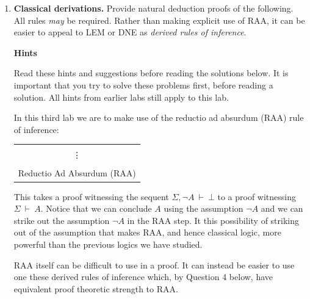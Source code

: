\documentclass[11pt]{report}
\newcommand{\temp}[2]{{\overline{#2}}^{#1}}
\begin{document}
\begin{enumerate}
\begin{enumerate}
			\begin{center}
				$\begin{array}{c}
					\infer[\lor E]{A}
						{\temp{\text{LEM}}{A \lor \lnot A}
						&
						A \to A
						&
						\infer[\to I,1]{\lnot A \to A}
							{\infer[\XF]{A}
								{\infer[\MP]{\bot}
									{\infer[1]{\cancel{\lnot A}}{}
									&
									\lnot \lnot A}}}}
				\end{array}$
			\end{center}
	\end{enumerate}
	
	\newpage
	\item \textbf{Classical derivations.} Provide natural deduction proofs of the following. All rules \emph{may} be required. Rather than making explicit use of RAA, it can be easier to appeal to LEM or DNE as \emph{derived rules of inference}. 
	
	\textbf{Hints}

	Read these hints and suggestions before reading the solutions below. It is important that you try to solve these problems first, before reading a solution. All hints from earlier labs still apply to this lab. 

	In this third lab we are to make use of the reductio ad absurdum (RAA) rule of inference: 

	\begin{center}
	\begin{tabular}{c}
		\infer[\RAA]{A}{\begin{array}{c}\Sigma, \lnot A \\ \vdots \\ \bot \end{array}}
		\\
		Reductio Ad Absurdum (RAA)
	\end{tabular}
	\end{center}

	This takes a proof witnessing the sequent $\Sigma, \lnot A \ \vdash \ \bot$ to a proof witnessing $\Sigma \ \vdash \ A$. Notice that we can conclude $A$ using the assumption $\lnot A$ and we can strike out the assumption $\lnot A$ in the RAA step. It this possibility of striking out of the assumption that makes RAA, and hence classical logic, more powerful than the previous logics we have studied. 

	RAA itself can be difficult to use in a proof. It can instead be easier to use one these derived rules of inference which, by Question 4 below, have equivalent proof theoretic strength to RAA. 
	

\end{enumerate}
\end{document}
